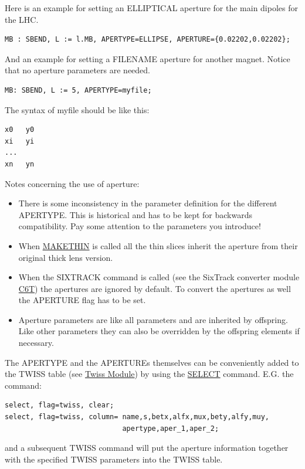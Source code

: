 Here is an example for setting an ELLIPTICAL aperture for the main
dipoles for the LHC.  
\begin{verbatim}
MB : SBEND, L := l.MB, APERTYPE=ELLIPSE, APERTURE={0.02202,0.02202};
\end{verbatim} 

And an example for setting a FILENAME aperture for another
magnet. Notice that no aperture parameters are needed.  
\begin{verbatim}
MB: SBEND, L := 5, APERTYPE=myfile;
\end{verbatim} 

The syntax of myfile should be like this: 
\begin{verbatim}
x0   y0
xi   yi
...
xn   yn
\end{verbatim}

Notes concerning the use of aperture: 
\begin{itemize}
   \item There is some inconsistency in the parameter definition for the
     different APERTYPE. This is historical and has to be kept for
     backwards compatibility. Pay some attention to the parameters you
     introduce! 
   \item When \href{../makethin/makethin.html}{MAKETHIN} is called all
     the  thin slices inherit the aperture from their original thick
     lens version.  
   \item When the SIXTRACK command is called (see the SixTrack converter
     module \href{../c6t/c6t.html}{C6T}) the apertures are ignored by
     default. To convert the apertures as well the APERTURE flag has to
     be set.  
   \item  Aperture parameters are like all parameters and are inherited
     by offspring. Like other parameters they can also be overridden by
     the offspring elements if necessary.  
\end{itemize}

The APERTYPE and the APERTUREs themselves can be conveniently added to
the TWISS table (see \href{../twiss/twiss.html}{Twiss Module}) by using
the \href{select.html}{SELECT} command. E.G. the command:   
\begin{verbatim}
select, flag=twiss, clear;
select, flag=twiss, column= name,s,betx,alfx,mux,bety,alfy,muy,
                            apertype,aper_1,aper_2;
\end{verbatim}
and a subsequent TWISS command will put the aperture information
together with the specified TWISS parameters into the TWISS table.   

